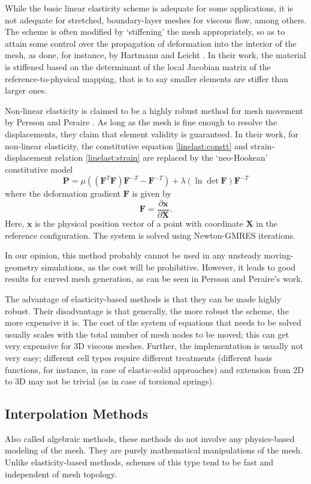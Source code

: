 \documentclass[11pt, ms, onehalfspacing]{ncsuthesis}
\let\bld\boldsymbol
\begin{document}
While the basic linear elasticity scheme is adequate for some applications, it is not adequate for stretched, boundary-layer meshes for viscous flow, among others. The scheme is often modified by `stiffening' the mesh appropriately, so as to attain some control over the propagation of deformation into the interior of the mesh, as done, for instance, by Hartmann and Leicht \cite{curve:hartmann}. In their work, the material is stiffened based on the determinant of the local Jacobian matrix of the reference-to-physical mapping, that is to say smaller elements are stiffer than larger ones.

Non-linear elasticity is claimed to be a highly robust method for mesh movement by Persson and Peraire \cite{curve:persson}. As long as the mesh is fine enough to resolve the displacements, they claim that element validity is guaranteed. In their work, for non-linear elasticity, the constitutive equation \eqref{linelast:constt} and strain-displacement relation \eqref{linelast:strain} are replaced by the `neo-Hookean' constitutive model
\begin{equation}
\bld{P} = \mu ((\boldsymbol{F}^T\bld{F})\bld{F}^{-T} - \bld{F}^{-T}) + \lambda(\ln \det\bld{F})\bld{F}^{-T}
\end{equation}
where the deformation gradient $\bld{F}$ is given by
\[
\bld{F} = \frac{\partial\bld{x}}{\partial\bld{X}}.
\]
Here, $\bld{x}$ is the physical position vector of a point with coordinate $\bld{X}$ in the reference configuration. The system is solved using Newton-GMRES iterations.

In our opinion, this method probably cannot be used in any unsteady moving-geometry simulations, as the cost will be prohibitive. However, it leads to good results for curved mesh generation, as can be seen in Persson and Peraire's work.

The advantage of elasticity-based methods is that they can be made highly robust. Their disadvantage is that generally, the more robust the scheme, the more expensive it is. The cost of the system of equations that needs to be solved usually scales with the total number of mesh nodes to be moved; this can get very expensive for 3D viscous meshes. Further, the implementation is usually not very easy; different cell types require different treatments (different basis functions, for instance, in case of elastic-solid approaches) and extension from 2D to 3D may not be trivial (as in case of torsional springs).

\subsection{Interpolation  Methods}
Also called algebraic methods, these methods do not involve any physics-based modeling of the mesh. They are purely mathematical manipulations of the mesh. Unlike elasticity-based methods, schemes of this type tend to be fast and independent of mesh topology. 
\end{document}
